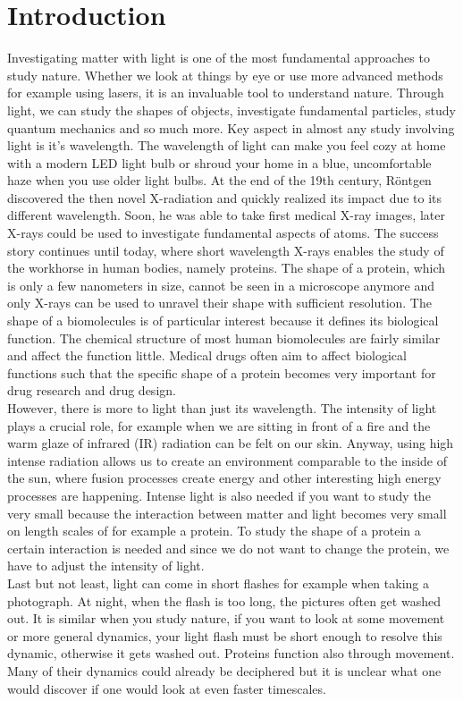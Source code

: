 \chapter{Introduction}
Investigating matter with light is one of the most fundamental approaches to study nature. Whether we look at things by eye or use more advanced methods for example using lasers, it is an invaluable tool to understand nature. Through light, we can study the shapes of objects, investigate fundamental particles, study quantum mechanics and so much more. Key aspect in almost any study involving light is it's wavelength. The wavelength of light can make you feel cozy at home with a modern LED light bulb or shroud your home in a blue, uncomfortable haze when you use older light bulbs. At the end of the 19th century, R\"ontgen discovered the then novel X-radiation and quickly realized its impact due to its different wavelength. Soon, he was able to take first medical X-ray images, later X-rays could be used to investigate fundamental aspects of atoms. The success story continues until today, where short wavelength X-rays enables the study of the workhorse in human bodies, namely proteins. The shape of a protein, which is only a few nanometers in size, cannot be seen in a microscope anymore and only X-rays can be used to unravel their shape with sufficient resolution. The shape of a biomolecules is of particular interest because it defines its biological function. The chemical structure of most human biomolecules are fairly similar and affect the function little. Medical drugs often aim to affect biological functions such that the specific shape of a protein becomes very important for drug research and drug design. \citep{Alcalde-2012-PRE}\\
However, there is more to light than just its wavelength. The intensity of light plays a crucial role, for example when we are sitting in front of a fire and the warm glaze of infrared (IR) radiation can be felt on our skin. Anyway, using high intense radiation allows us to create an environment comparable to the inside of the sun, where fusion processes create energy and other interesting high energy processes are happening. Intense light is also needed if you want to study the very small because the interaction between matter and light becomes very small on length scales of for example a protein. To study the shape of a protein a certain interaction is needed and since we do not want to change the protein, we have to adjust the intensity of light.\\
Last but not least, light can come in short flashes for example when taking a photograph. At night, when the flash is too long, the pictures often get washed out. It is similar when you study nature, if you want to look at some movement or more general dynamics, your light flash must be short enough to resolve this dynamic, otherwise it gets washed out. Proteins function also through movement. Many of their dynamics could already be deciphered but it is unclear what one would discover if one would look at even faster timescales.\\
